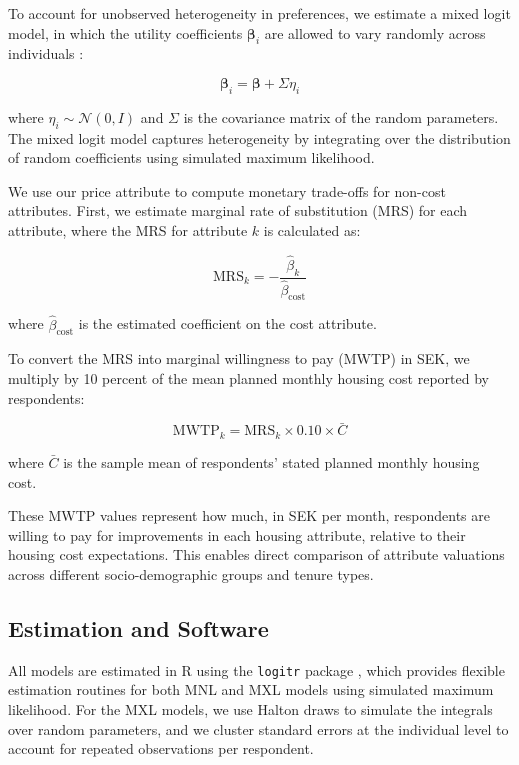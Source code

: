 \documentclass[3p,11pt ]{elsarticle}
\begin{document}
To account for unobserved heterogeneity in preferences, we estimate a mixed logit model, in which the utility coefficients \( \boldsymbol{\beta}_i \) are allowed to vary randomly across individuals \citep{mcfaddenMixedMNLModels2000}:

\begin{equation}
\boldsymbol{\beta}_i = \boldsymbol{\beta} + \Sigma \eta_i
\end{equation}

\noindent where \( \eta_i \sim \mathcal{N}(0, I) \) and \( \Sigma \) is the covariance matrix of the random parameters. The mixed logit model captures heterogeneity by integrating over the distribution of random coefficients using simulated maximum likelihood.

We use our price attribute to compute monetary trade-offs for non-cost attributes. 
First,
we estimate marginal rate of substitution (MRS) for each attribute,
where the MRS for attribute \( k \) is calculated as:

\begin{equation}
\text{MRS}_k = -\frac{\hat{\beta}_k}{\hat{\beta}_{\text{cost}}}
\end{equation}

\noindent where \( \hat{\beta}_{\text{cost}} \) is the estimated coefficient on the cost attribute.

To convert the MRS into marginal willingness to pay (MWTP) in SEK, we multiply by 10 percent of the mean planned monthly housing cost reported by respondents:

\begin{equation}
\text{MWTP}_k = \text{MRS}_k \times 0.10 \times \bar{C}
\end{equation}

\noindent where \( \bar{C} \) is the sample mean of respondents' stated planned monthly housing cost.

These MWTP values represent how much, in SEK per month, respondents are willing to pay for improvements in each housing attribute, relative to their housing cost expectations. This enables direct comparison of attribute valuations across different socio-demographic groups and tenure types.

\subsection{Estimation and Software}

All models are estimated in R using the \texttt{logitr} package \citep{helvestonLogitrFastEstimation2022}, which provides flexible estimation routines for both MNL and MXL models using simulated maximum likelihood. For the MXL models, we use Halton draws to simulate the integrals over random parameters, and we cluster standard errors at the individual level to account for repeated observations per respondent.
\end{document}
